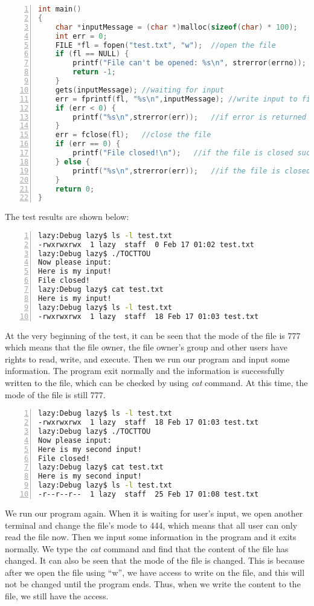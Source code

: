 \begin{enumerate}
\begin{lstlisting}[language=C,numbers=left,numberstyle=\tiny,columns=fullflexible,basicstyle=\footnotesize\ttfamily, breaklines=true, breakautoindent=true, breakindent=4em]
int main()
{
    char *inputMessage = (char *)malloc(sizeof(char) * 100);    //init and allocate memory for user input
    int err = 0;
    FILE *fl = fopen("test.txt", "w");  //open the file
    if (fl == NULL) {
        printf("File can't be opened: %s\n", strerror(errno));  //if file is not opened
        return -1;
    }
    gets(inputMessage); //waiting for input
    err = fprintf(fl, "%s\n",inputMessage); //write input to file
    if (err < 0) {
        printf("%s\n",strerror(err));   //if error is returned in writing
    }
    err = fclose(fl);   //close the file
    if (err == 0) {
        printf("File closed!\n");   //if the file is closed successfully
    } else {
        printf("%s\n",strerror(err));   //if the file is closed with error
    }
    return 0;
}
\end{lstlisting}
The test results are shown below:
\begin{lstlisting}[language=sh,numbers=left,numberstyle=\tiny,columns=fullflexible,basicstyle=\footnotesize\ttfamily, breaklines=true, breakautoindent=true, breakindent=4em]
lazy:Debug lazy$ ls -l test.txt 
-rwxrwxrwx  1 lazy  staff  0 Feb 17 01:02 test.txt
lazy:Debug lazy$ ./TOCTTOU 
Now please input:
Here is my input!
File closed!
lazy:Debug lazy$ cat test.txt 
Here is my input!
lazy:Debug lazy$ ls -l test.txt 
-rwxrwxrwx  1 lazy  staff  18 Feb 17 01:03 test.txt
\end{lstlisting}
At the very beginning of the test, it can be seen that the mode of the file is 777 which means that the file owner, the file owner's group and other users have rights to read, write, and execute. Then we run our program and input some information. The program exit normally and the information is successfully written to the file, which can be checked by using \textit{cat} command. At this time, the mode of the file is still 777.
\begin{lstlisting}[language=sh,numbers=left,numberstyle=\tiny,columns=fullflexible,basicstyle=\footnotesize\ttfamily, breaklines=true, breakautoindent=true, breakindent=4em]
lazy:Debug lazy$ ls -l test.txt 
-rwxrwxrwx  1 lazy  staff  18 Feb 17 01:03 test.txt
lazy:Debug lazy$ ./TOCTTOU 
Now please input:
Here is my second input!
File closed!
lazy:Debug lazy$ cat test.txt 
Here is my second input!
lazy:Debug lazy$ ls -l test.txt 
-r--r--r--  1 lazy  staff  25 Feb 17 01:08 test.txt
\end{lstlisting}
We run our program again. When it is waiting for user's input, we open another terminal and change the file's mode to 444, which means that all user can only read the file now. Then we input some information in the program and it exits normally. We type the \textit{cat} command and find that the content of the file has changed. It can also be seen that the mode of the file is changed. This is because after we open the file using ``w'', we have access to write on the file, and this will not be changed until the program ends. Thus, when we write the content to the file, we still have the access.

\end{enumerate}

